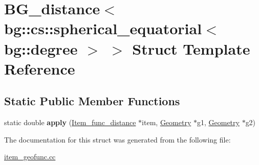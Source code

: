\hypertarget{structBG__distance_3_01bg_1_1cs_1_1spherical__equatorial_3_01bg_1_1degree_01_4_01_4}{}\section{B\+G\+\_\+distance$<$ bg\+:\+:cs\+:\+:spherical\+\_\+equatorial$<$ bg\+:\+:degree $>$ $>$ Struct Template Reference}
\label{structBG__distance_3_01bg_1_1cs_1_1spherical__equatorial_3_01bg_1_1degree_01_4_01_4}
\subsection*{Static Public Member Functions}
\begin{DoxyCompactItemize}
\item 
\mbox{\label{structBG__distance_3_01bg_1_1cs_1_1spherical__equatorial_3_01bg_1_1degree_01_4_01_4_ab289ba920dd9fe12917a144799c65d14}} 
static double {\bfseries apply} (\mbox{\hyperlink{classItem__func__distance}{Item\+\_\+func\+\_\+distance}} $\ast$item, \mbox{\hyperlink{classGeometry}{Geometry}} $\ast$g1, \mbox{\hyperlink{classGeometry}{Geometry}} $\ast$g2)
\end{DoxyCompactItemize}


The documentation for this struct was generated from the following file\+:\begin{DoxyCompactItemize}
\item 
\mbox{\hyperlink{item__geofunc_8cc}{item\+\_\+geofunc.\+cc}}\end{DoxyCompactItemize}
